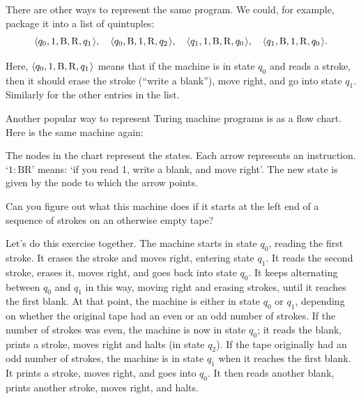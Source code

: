 There are other ways to represent the same program.
We could, for example, package it into a list of quintuples:
\begin{equation*}
  \t{q_{0}, 1, \mathrm{B}, \mathrm{R}, q_{1}}, \quad
  \t{q_{0}, \mathrm{B}, 1, \mathrm{R}, q_{2}}, \quad
  \t{q_{1}, 1, \mathrm{B}, \mathrm{R}, q_{0}}, \quad
  \t{q_{1}, \mathrm{B}, 1, \mathrm{R}, q_{0}}.
\end{equation*}

\noindent%
Here,
$\t{q_{0}, 1, \mathrm{B}, \mathrm{R}, q_{1}}$ means that
if the machine is in state $q_{0}$ and reads a stroke,
then it should erase the stroke (``write a blank''), move right, and go into state $q_{1}$.
Similarly for the other entries in the list.

Another popular way to represent Turing machine programs is as a flow chart.
Here is the same machine again:

\begin{center}
  
\end{center}

The nodes in the chart represent the states.
Each arrow represents an instruction.
`$1: \mathrm{B}\mathrm{R}$' means:
`if you read 1, write a blank, and move right'.
The new state is given by the node to which the arrow points.

\begin{exercise}\label{ex:first-tm}
  Can you figure out what this machine does if it starts
  at the left end of a sequence of strokes
  on an otherwise empty tape?
\end{exercise}

Let's do this exercise together.
The machine starts in state $q_{0}$, reading the first stroke.
It erases the stroke and moves right,
entering state $q_{1}$.
It reads the second stroke,
erases it, moves right, and goes back into state $q_{0}$.
It keeps alternating between $q_{0}$ and $q_{1}$ in this way,
moving right and erasing strokes,
until it reaches the first blank.
At that point,
the machine is either in state $q_{0}$ or $q_{1}$,
depending on whether the original tape had an even or an odd number of strokes.
If the number of strokes was even,
the machine is now in state $q_{0}$;
it reads the blank, prints a stroke, moves right and halts (in state $q_{2}$).
If the tape originally had an odd number of strokes,
the machine is in state $q_{1}$ when it reaches the first blank.
It prints a stroke, moves right, and goes into $q_{0}$.
It then reads another blank, prints another stroke, moves right, and halts.

